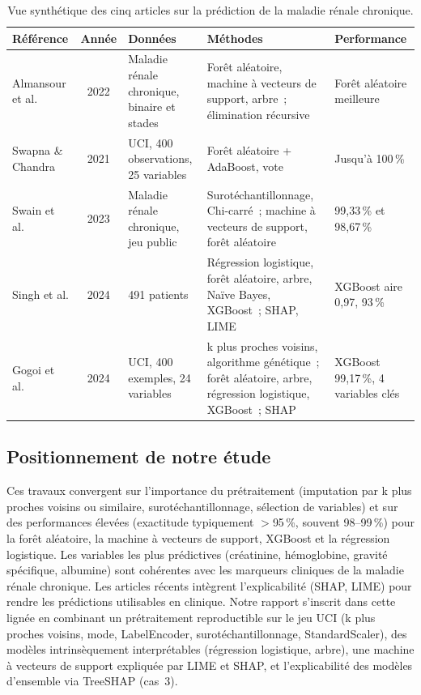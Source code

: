 \begin{table}[H]
\centering
\caption{Vue synthétique des cinq articles sur la prédiction de la maladie rénale chronique.}
\label{tab:ckd-articles}
\small
\begin{tabularx}{\textwidth}{|p{2.4cm}|c|p{2.6cm}|p{3.2cm}|p{2.4cm}|}
\toprule
\textbf{Référence} & \textbf{Année} & \textbf{Données} & \textbf{Méthodes} & \textbf{Performance} \\
\midrule
Almansour et al. \cite{almansour2022ckd} & 2022 & Maladie rénale chronique, binaire et stades & Forêt aléatoire, machine à vecteurs de support, arbre~; élimination récursive & Forêt aléatoire meilleure \\
Swapna \& Chandra \cite{swapna2021ckd} & 2021 & UCI, 400 observations, 25 variables & Forêt aléatoire + AdaBoost, vote & Jusqu'à 100\,\% \\
Swain et al. \cite{swain2023ckd} & 2023 & Maladie rénale chronique, jeu public & Surotéchantillonnage, Chi-carré~; machine à vecteurs de support, forêt aléatoire & 99,33\,\% et 98,67\,\% \\
Singh et al. \cite{ckd_xai_nature2024} & 2024 & 491 patients & Régression logistique, forêt aléatoire, arbre, Naïve Bayes, XGBoost~; SHAP, LIME & XGBoost aire 0,97, 93\,\% \\
Gogoi et al. \cite{gogoi2025ckd_shap} & 2024 & UCI, 400 exemples, 24 variables & k plus proches voisins, algorithme génétique~; forêt aléatoire, arbre, régression logistique, XGBoost~; SHAP & XGBoost 99,17\,\%, 4 variables clés \\
\bottomrule
\end{tabularx}
\end{table}

\subsection{Positionnement de notre étude}
\label{ssec:positionnement}

Ces travaux convergent sur l'importance du prétraitement (imputation par k plus proches voisins ou similaire, surotéchantillonnage, sélection de variables) et sur des performances élevées (exactitude typiquement $>$95\,\%, souvent 98--99\,\%) pour la forêt aléatoire, la machine à vecteurs de support, XGBoost et la régression logistique. Les variables les plus prédictives (créatinine, hémoglobine, gravité spécifique, albumine) sont cohérentes avec les marqueurs cliniques de la maladie rénale chronique. Les articles récents intègrent l'explicabilité (SHAP, LIME) pour rendre les prédictions utilisables en clinique. Notre rapport s'inscrit dans cette lignée en combinant un prétraitement reproductible sur le jeu UCI (k plus proches voisins, mode, LabelEncoder, surotéchantillonnage, StandardScaler), des modèles intrinsèquement interprétables (régression logistique, arbre), une machine à vecteurs de support expliquée par LIME et SHAP, et l'explicabilité des modèles d'ensemble via TreeSHAP (cas~3).
